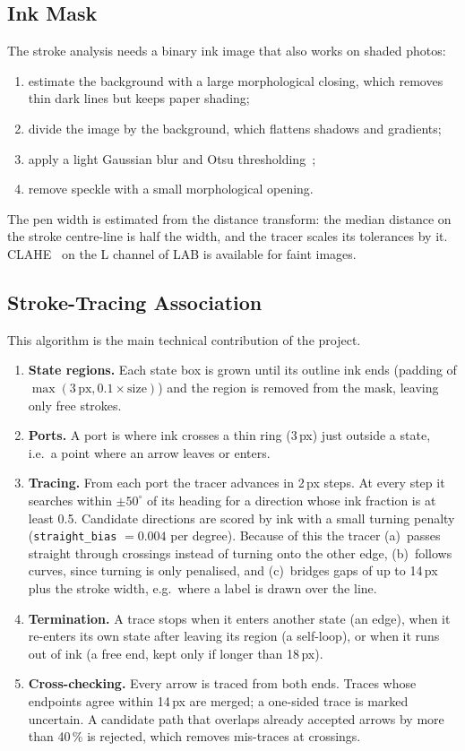 \documentclass[journal,10pt]{IEEEtran}
\newcommand{\code}[1]{\texttt{#1}}
\begin{document}
\subsection{Ink Mask}
The stroke analysis needs a binary ink image that also works on shaded photos:
\begin{enumerate}
\item estimate the background with a large morphological closing, which removes thin dark
lines but keeps paper shading;
\item divide the image by the background, which flattens shadows and gradients;
\item apply a light Gaussian blur and Otsu thresholding~\cite{otsu};
\item remove speckle with a small morphological opening.
\end{enumerate}
The pen width is estimated from the distance transform: the median distance on the stroke
centre-line is half the width, and the tracer scales its tolerances by it. CLAHE~\cite{clahe}
on the L channel of LAB is available for faint images.

\subsection{Stroke-Tracing Association}
This algorithm is the main technical contribution of the project.
\begin{enumerate}
\item \textbf{State regions.} Each state box is grown until its outline ink ends
(padding of $\max(3\,\text{px}, 0.1\times\text{size})$) and the region is removed from the
mask, leaving only free strokes.
\item \textbf{Ports.} A port is where ink crosses a thin ring (3\,px) just outside a state,
i.e.\ a point where an arrow leaves or enters.
\item \textbf{Tracing.} From each port the tracer advances in 2\,px steps. At every step
it searches within $\pm50^\circ$ of its heading for a direction whose ink fraction is at
least 0.5. Candidate directions are scored by ink with a small turning penalty
(\code{straight\_bias} $=0.004$ per degree). Because of this the tracer
(a)~passes straight through crossings instead of turning onto the other edge,
(b)~follows curves, since turning is only penalised, and
(c)~bridges gaps of up to 14\,px plus the stroke width, e.g.\ where a label is drawn over
the line.
\item \textbf{Termination.} A trace stops when it enters another state (an edge), when it
re-enters its own state after leaving its region (a self-loop), or when it runs out of ink
(a free end, kept only if longer than 18\,px).
\item \textbf{Cross-checking.} Every arrow is traced from both ends. Traces whose endpoints
agree within 14\,px are merged; a one-sided trace is marked uncertain. A candidate path
that overlaps already accepted arrows by more than 40\,\% is rejected, which removes
mis-traces at crossings.
\end{enumerate}
\end{document}
